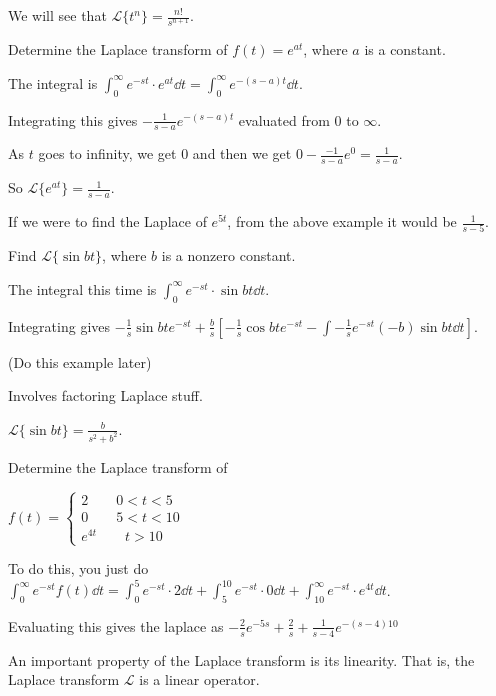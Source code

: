 \documentclass[../diffeq.tex]{subfiles}
\begin{document}
We will see that $\mathcal{L}\{t^n\} = \frac{n!}{s^{n+1}}$.

\pagebreak
\begin{example}
    Determine the Laplace transform of $f(t)=e^{at}$, where $a$ is a constant.

    The integral is $\int_0^{\infty}e^{-st}\cdot e^{at}\dd t = \int_0^{\infty}e^{-(s-a)t}\dd t$.

    Integrating this gives $-\frac{1}{s-a}e^{-(s-a)t}$ evaluated from $0$ to $\infty$.

    As $t$ goes to infinity, we get $0$ and then we get $0-\frac{-1}{s-a}e^0 = \frac{1}{s-a}$.

    So $\mathcal{L}\{e^{at}\}=\frac{1}{s-a}$.
\end{example}

If we were to find the Laplace of $e^{5t}$, from the above example it would be $\frac{1}{s-5}$.

\begin{example}
    Find $\mathcal{L}\{\sin bt\}$, where $b$ is a nonzero constant.

    The integral this time is $\int_0^{\infty}e^{-st}\cdot\sin bt \dd t$.

    Integrating gives $-\frac{1}{s}\sin bt e^{-st}+\frac{b}{s}\left[-\frac{1}{s}\cos bt e^{-st}-\int -\frac{1}{s}e^{-st}(-b)\sin bt \dd t \right]$.

    (Do this example later)

    Involves factoring Laplace stuff.

    $\mathcal{L}\{\sin bt\} = \frac{b}{s^2+b^2}$.
\end{example}

\begin{example}
    Determine the Laplace transform of 

    $f(t)=\begin{cases}
        2 \qquad 0<t<5 \\ 
        0 \qquad 5<t<10 \\
        e^{4t} \qquad t>10
    \end{cases}$

    To do this, you just do $\int_0^{\infty}e^{-st}f(t)\dd t = \int_0^5 e^{-st}\cdot 2 \dd t + \int_5^{10}e^{-st}\cdot 0 \dd t + \int_10^{\infty}e^{-st}\cdot e^{4t}\dd t$.

    Evaluating this gives the laplace as $-\frac{2}{s}e^{-5s}+\frac{2}{s}+\frac{1}{s-4}e^{-(s-4)10}$
\end{example}

An important property of the Laplace transform is its linearity. That is, the Laplace transform $\mathcal{L}$ is a linear operator.
\end{document}

